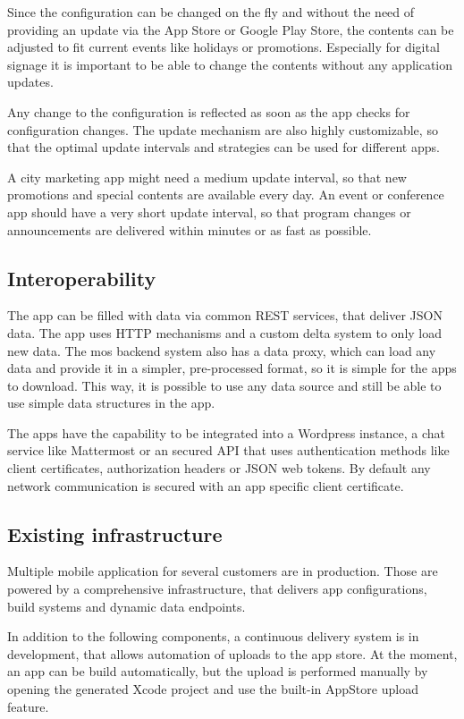 Since the configuration can be changed on the fly and without the need of providing an update via the App Store or Google Play Store, the contents can be adjusted to fit current events like holidays or promotions.
Especially for digital signage it is important to be able to change the contents without any application updates.

Any change to the configuration is reflected as soon as the app checks for configuration changes.
The update mechanism are also highly customizable, so that the optimal update intervals and strategies can be used for different apps.

A city marketing app might need a medium update interval, so that new promotions and special contents are available every day.
An event or conference app should have a very short update interval, so that program changes or announcements are delivered within minutes or as fast as possible.


\subsection{Interoperability}

The app can be filled with data via common REST services, that deliver JSON data.
The app uses HTTP mechanisms and a custom delta system to only load new data.
The mos backend system also has a data proxy, which can load any data and provide it in a simpler, pre-processed format, so it is simple for the apps to download.
This way, it is possible to use any data source and still be able to use simple data structures in the app.

The apps have the capability to be integrated into a Wordpress instance, a chat service like Mattermost or an secured \ac{API} that uses authentication methods like client certificates, authorization headers or JSON web tokens.
By default any network communication is secured with an app specific client certificate.

\subsection{Existing infrastructure}

Multiple mobile application for several customers are in production.
Those are powered by a comprehensive infrastructure, that delivers app configurations, build systems and dynamic data endpoints.

In addition to the following components, a continuous delivery system is in development, that allows automation of uploads to the app store.
At the moment, an app can be build automatically, but the upload is performed manually by opening the generated Xcode project and use the built-in AppStore upload feature.

